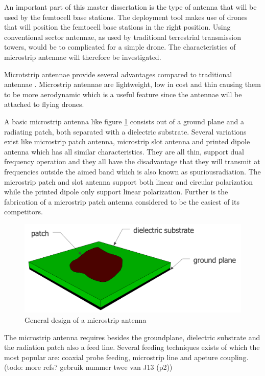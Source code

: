 An important part of this master dissertation is the type of antenna that will be used by the femtocell base stations. The deployment tool makes use
of drones that will position the femtocell base stations in the right position.  Using conventional 
sector antennae, as used by traditional terrestrial transmission towers, would be to complicated for a simple drone. 
The characteristics of microstrip antennae will therefore be investigated.

Microtstrip antennae provide several advantages compared to traditional antennae \cite{J13_singh2011micro, J14_antennadesign}. Microstrip antennae
are lightweight, low in cost and thin causing them to be more aerodynamic which is  a useful feature since the antennae will be attached
to flying drones.

A basic microstrip antenna like figure \ref{fig:basicpatchantenna} consists out of a ground plane and
a radiating patch, both separated with a dielectric substrate. Several variations exist like microstrip patch antenna, microstrip slot antenna and printed dipole antenna which
has all similar characteristics. They are all thin, support dual frequency operation and they all have the disadvantage that they 
will transmit at frequencies outside the aimed band which is also known as
\gls{spuriousradiation}. The microstrip patch and slot antenna support both linear
and circular polarization while the printed dipole only support linear polarization. Further is the fabrication of a microstrip patch antenna considered to be the easiest of its competitors. 

\begin{figure}[H]
\centering
  \includegraphics[width=\textwidth/2]{../images/patchantenna.png}
  \caption{General design of a microstrip antenna}
  \label{fig:basicpatchantenna}
\end{figure}

The microstrip antenna requires besides the groundplane, dielectric substrate and the radiation patch also a feed line. Several feeding techniques exists of which the most popular are: coaxial probe feeding, microstrip line and apeture coupling. %
(todo: more refs? gebruik nummer twee van J13 (p2))

